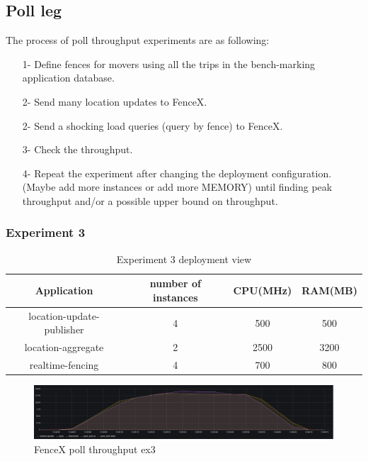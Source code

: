 \documentclass[a4]{report}
\begin{document}
    \subsection{Poll leg}
    The process of poll throughput experiments are as following:
    \begin{itemize}
        \item[1-] Define fences for movers using all the trips in the bench-marking application database.
        \item[2-] Send many location updates to FenceX.
        \item[2-] Send a shocking load queries (query by fence) to FenceX.
        \item[3-] Check the throughput.
        \item[4-] Repeat the experiment after changing the deployment configuration. (Maybe add more instances or add
        more MEMORY) until finding peak throughput and/or a possible upper bound on throughput.
    \end{itemize}

    \subsubsection{Experiment 3}

    \begin{table}[h!]
        \centering
        \begin{tabular}{|c|c|c|c|}
            \hline
            Application               & number of instances & CPU(MHz) & RAM(MB) \\
            \hline
            location-update-publisher & 4                   & 500      & 500     \\
            location-aggregate        & 2                   & 2500     & 3200    \\
            realtime-fencing          & 4                   & 700      & 800     \\
            \hline
        \end{tabular}
        \caption{Experiment 3 deployment view}
        \label{table:ex3-dv}
    \end{table}
    
    \begin{figure}[h!]
        \caption{FenceX poll throughput ex3}
        \label{fig:ex3}
        \includegraphics[scale=0.4]{images/evaluation/ex3-benchmarking(16,9).png}
    \end{figure}
\end{document}
